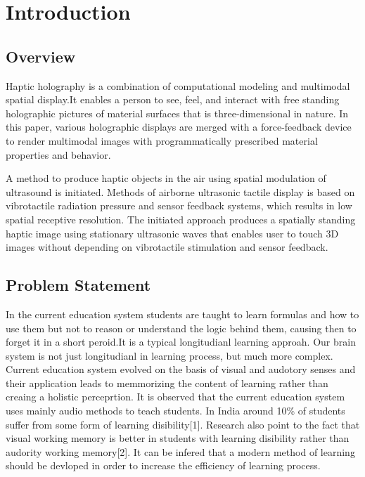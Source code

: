 \documentclass{fisatproject}
\begin{document}
\cleardoublepage
{}
\listoftables
\newpage



\chapter{Introduction}
\setcounter{page}{1}
\renewcommand{\baselinestretch}{1.50}
\section{Overview}
\par Haptic holography is a combination of computational modeling and multimodal spatial display.It enables a person to see, feel, and interact with free standing holographic pictures of material surfaces that is three-dimensional in nature. In this paper, various holographic displays are merged with a force-feedback device to render multimodal images with programmatically prescribed material properties and behavior.


\par A method to produce haptic objects in the air using spatial modulation of ultrasound is initiated. Methods of airborne ultrasonic tactile display is based on vibrotactile radiation pressure and sensor feedback systems, which results in low spatial receptive resolution. The initiated approach produces a spatially standing haptic image using stationary ultrasonic waves that enables user to touch 3D images without depending on vibrotactile stimulation and sensor feedback.


\section{Problem Statement}

\par In the current education system students are taught to learn formulas and how to use them but not to reason or understand the logic behind them, causing then to forget it in a short peroid.It is a typical longitudianl learning approah. Our brain system is not just longitudianl in learning process, but much more complex. Current education system evolved on the basis of visual and audotory senses and their application leads to memmorizing the content of learning rather than creaing a holistic perceprtion.
It is observed that the current education system  uses mainly audio methods to teach students.
In India around 10\% of students suffer from some form of learning disibility[1]. Research also point to the fact that visual working memory is better in students with learning disibility rather than audority working memory[2].
It can be infered that a modern method of learning should be devloped in order to increase the efficiency of learning process.
\end{document}
